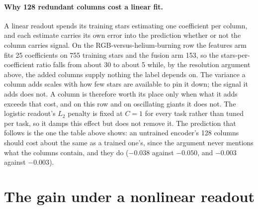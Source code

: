 \documentclass{article}
\begin{document}
\paragraph{Why 128 redundant columns cost a linear fit.} A linear readout spends its training stars
estimating one coefficient per column, and each estimate carries its own error into the prediction
whether or not the column carries signal. On the RGB-versus-helium-burning row the features arm fits
25 coefficients on 755 training stars and the fusion arm 153, so the stars-per-coefficient ratio
falls from about 30 to about 5 while, by the resolution argument above, the added columns supply
nothing the label depends on. The variance a column adds scales with how few stars are available to
pin it down; the signal it adds does not. A column is therefore worth its place only when what it
adds exceeds that cost, and on this row and on oscillating giants it does not. The logistic readout's
$L_{2}$ penalty is fixed at $C = 1$ for every task rather than tuned per task, so it damps this effect
but does not remove it. The prediction that follows is the one the table above shows: an untrained
encoder's 128 columns should cost about the same as a trained one's, since the argument never
mentions what the columns contain, and they do ($-0.038$ against $-0.050$, and $-0.003$ against
$-0.003$).

\section{The gain under a nonlinear readout}
\label{app:readout}

\begin{table}[H]
\caption{What 128 added columns change, relative to the 25 features alone, under each frozen readout
(mean over six encoder seeds; absolute scores are in Table~\ref{tab:scorecard}). $+\mu$: our encoder.
No prediction term: the same recipe trained without the GRU prediction term. Retained: the share of
the full $\mu$ gain that survives that removal, printed only where the full gain is a gain, and
negative where the gain changes sign rather than shrinking. Untrained: a randomly
initialised encoder, which is a single encoder and carries no band. Bold: beyond $2\,\mathrm{SE}$ ---
unlike Table~\ref{tab:scorecard}, where bold marks the best point estimate and implies no test. The
last row counts tasks won, tied and lost at that bar.}
\label{tab:readout}
\centering
\scriptsize

\end{table}
\end{document}
